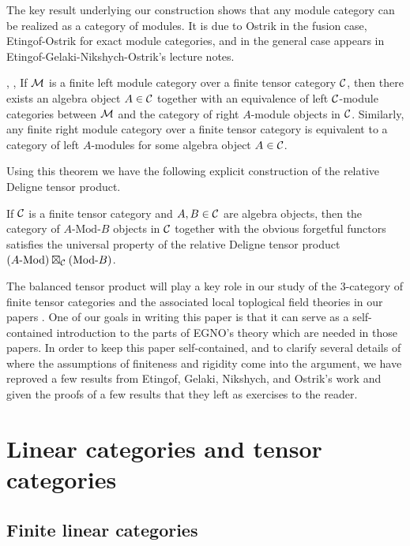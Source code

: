 \documentclass{amsart}
\begin{document}
The key result underlying our construction shows that any module category can be realized as a category of modules.  It is due to Ostrik in the fusion case, Etingof-Ostrik for exact module categories, and in the general case appears in Etingof-Gelaki-Nikshych-Ostrik's lecture notes.

\begin{theorem}{\cite[Thm 2.11.6]{EGNO}, \cite[\S 3.2]{EO-ftc}, \cite[Thm 1]{MR1976459}} \label{thm:EGNO2.11.6}
	If $\mathcal M$ is a finite left module category over a finite tensor category $\mathcal C$, then there exists an algebra object $A \in \mathcal C$ together with an equivalence of left $\mathcal C$-module categories between $\mathcal M$ and the category of right $A$-module objects in $\mathcal C$.  Similarly, any finite right module category over a finite tensor category is equivalent to a category of left $A$-modules for some algebra object $A \in \mathcal C$.
\end{theorem}

Using this theorem we have the following explicit construction of the relative Deligne tensor product.

\begin{theorem}
If $\mathcal C$ is a finite tensor category and $A, B \in \mathcal C$ are algebra objects, then the category of $A\text{-Mod-}B$ objects in $\mathcal C$ together with the obvious forgetful functors satisfies the universal property of the relative Deligne tensor product $(A\text{-Mod}) \boxtimes_\mathcal C (\text{Mod-}B)$.
\end{theorem}

The balanced tensor product will play a key role in our study of the $3$-category of finite tensor categories and the associated local toplogical field theories in our papers \cite{3TC, DTCI}.  One of our goals in writing this paper is that it can serve as a self-contained introduction to the parts of EGNO's theory which are needed in those papers.  In order to keep this paper self-contained, and to clarify several details of where the assumptions of finiteness and rigidity come into the argument, we have reproved a few results from Etingof, Gelaki, Nikshych, and Ostrik's work and given the proofs of a few results that they left as exercises to the reader.

\section{Linear categories and tensor categories} \label{sec:tc-lincat}

\subsection{Finite linear categories}
\end{document}
